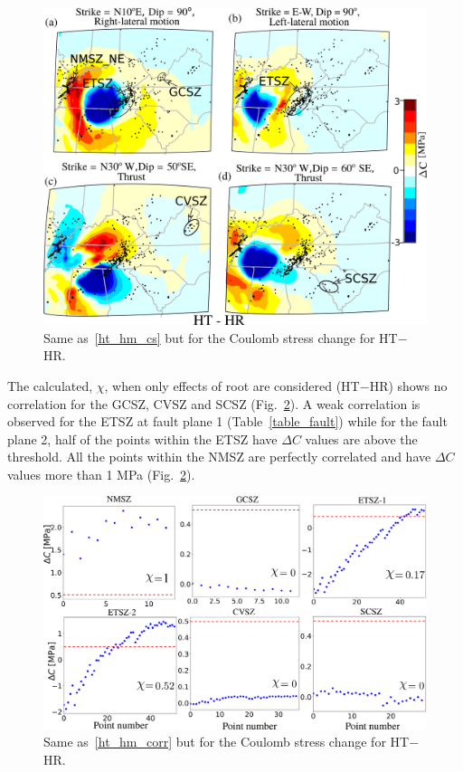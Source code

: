 \documentclass[draft,linenumbers]{agujournal2018}
\begin{document}
\begin{figure}[h!]
    \centering
    \includegraphics[width=0.75\linewidth]{figures/cs_ht_hr.png}
    \caption{Same as~\ref{ht_hm_cs} but for the Coulomb stress change for HT$-$HR. }
    \label{ht_hr_cs}
\end{figure}

The calculated, $\chi$, when only effects of root are considered (HT$-$HR) shows no correlation for the GCSZ, CVSZ and SCSZ (Fig.~\ref{ht_hr_corr}). A weak correlation is observed for the ETSZ at fault plane 1 (Table~\ref{table_fault}) while for the fault plane 2, half of the points within the ETSZ have $\Delta C$  values are above the threshold. All the points within the NMSZ are perfectly correlated and have $\Delta C$ values more than 1 MPa (Fig.~\ref{ht_hr_corr}).

\begin{figure}[h!]
    \centering
    \includegraphics[width=0.75\linewidth]{figures/corr_cs_ht_hr.png}
    \caption{Same as~\ref{ht_hm_corr} but for the Coulomb stress change for HT$-$HR.}
    \label{ht_hr_corr}
\end{figure}

    
\end{document}
